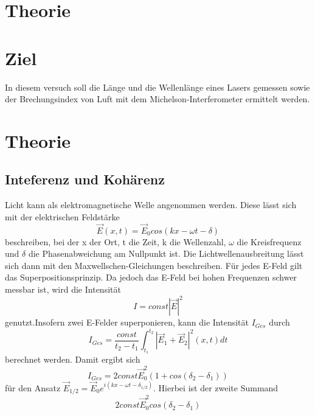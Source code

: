 \section{Theorie}
\label{sec:Theorie}
\section{Ziel}

In diesem versuch soll die Länge und die Wellenlänge eines Lasers gemessen sowie der Brechungsindex von Luft mit dem Michelson-Interferometer ermittelt werden.

\section{Theorie}

\subsection{Inteferenz und Kohärenz}
Licht kann als elektromagnetische Welle angenommen werden. Diese lässt sich mit der elektrischen Feldstärke 
\begin{equation}
  \vec E(x,t)=\vec E_{0}cos(kx-\omega t-\delta) \nonumber
\end{equation}
beschreiben, bei der x der Ort, t die Zeit, k die Wellenzahl, $\omega$ die Kreisfrequenz und $\delta$ die Phasenabweichung am Nullpunkt ist. Die Lichtwellenausbreitung lässt sich dann mit den Maxwellschen-Gleichungen beschreiben. Für jedes E-Feld gilt das Superpositionsprinzip. Da jedoch das E-Feld bei hohen Frequenzen schwer messbar ist, wird die Intensität 
\begin{equation}
  I=const|\vec E|^2 \nonumber
\end{equation}
genutzt.Insofern zwei E-Felder superponieren, kann die Intensität $I_{Ges}$ durch
\begin{equation}
  I_{Ges}=\frac{const}{t_{2}-t_{1}} \int^{t_{2}}_{t_{1}} |\vec E_{1}+\vec E_{2}|^2 (x,t)dt \nonumber
\end{equation}
berechnet werden. Damit ergibt sich 
\begin{equation}
  I_{Ges}=2const\vec E_{0}^2 (1+cos(\delta_{2}-\delta_{1})) \nonumber
\end{equation}
für den Ansatz $\vec E_{1/2}=\vec E_{0}e^{i(kx-\omega t -\delta_{1/2})}$. Hierbei ist der zweite Summand
\begin{equation}
  2const\vec E_{0}^2 cos(\delta_{2}-\delta_{1}) \nonumber
\end{equation}
